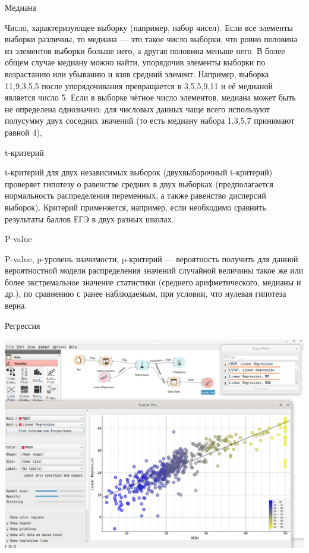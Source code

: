 \documentclass{beamer}
\begin{document}
\begin{frame}{Медиана}

Число, характеризующее выборку (например, набор чисел). Если все элементы выборки различны, то медиана — это такое число выборки, 
что ровно половина из элементов выборки больше него, а другая половина меньше него. 
В более общем случае медиану можно найти, упорядочив элементы выборки по возрастанию или 
убыванию и взяв средний элемент. Например, выборка 11,9,3,5,5 после упорядочивания 
превращается в 3,5,5,9,11 и её медианой является число 5. Если в выборке чётное число 
элементов, медиана может быть не определена однозначно: для числовых данных чаще всего используют 
полусумму двух соседних значений (то есть медиану набора 1,3,5,7 принимают равной 4), 

\end{frame}


\begin{frame}{t-критерий}


t-критерий для двух независимых выборок (двухвыборочный t-критерий) 
проверяет гипотезу о равенстве средних в двух выборках 
(предполагается нормальность распределения переменных, а также равенство дисперсий выборок).
 Критерий применяется, например, если необходимо сравнить результаты баллов ЕГЭ в двух разных школах. 

\end{frame}

\begin{frame}{P-value}

P-value,  p-уровень значимости, p-критерий — вероятность получить 
для данной вероятностной модели распределения значений случайной величины 
такое же или более экстремальное 
значение статистики (среднего арифметического, медианы и др.), 
по сравнению с ранее наблюдаемым, при условии, что нулевая гипотеза верна. 

\end{frame}

\begin{frame}{Регрессия}

\includegraphics[scale=0.2]{ris_04.png}

\end{frame}
\end{document}
